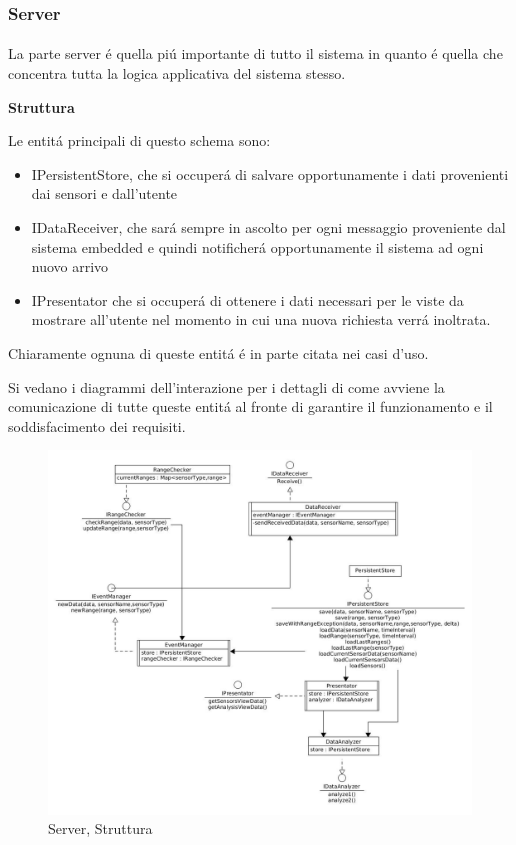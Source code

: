 \subsubsection{Server}

\paragraph{}La parte server \'e quella pi\'u importante di tutto il sistema in quanto \'e quella che concentra tutta la logica applicativa del sistema stesso.

\begin{center}
\textbf{Struttura}
\end{center}

Le entit\'a principali di questo schema sono:
\begin{itemize}
  \item IPersistentStore, che si occuper\'a di salvare opportunamente i dati provenienti dai sensori e dall'utente
  \item IDataReceiver, che sar\'a sempre in ascolto per ogni messaggio proveniente dal sistema embedded e quindi notificher\'a opportunamente il sistema ad ogni nuovo arrivo
  \item IPresentator che si occuper\'a di ottenere i dati necessari per le viste da mostrare all'utente nel momento in cui una nuova richiesta verr\'a inoltrata.
\end{itemize}

Chiaramente ognuna di queste entit\'a \'e in parte citata nei casi d'uso.

Si vedano i diagrammi dell'interazione per i dettagli di come avviene la comunicazione di tutte queste entit\'a al fronte di garantire il funzionamento e il soddisfacimento dei requisiti.


\begin{figure}[ph]
\centering
\includegraphics[width=\textwidth,height=\textheight,keepaspectratio]{Figures/DomainModel/Server/Structure}
\caption{Server, Struttura}
\end{figure}


